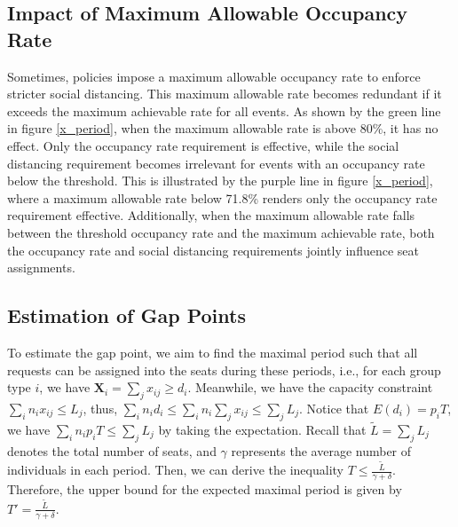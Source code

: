 \subsection*{Impact of Maximum Allowable Occupancy Rate}
Sometimes, policies impose a maximum allowable occupancy rate to enforce stricter social distancing. This maximum allowable rate becomes redundant if it exceeds the maximum achievable rate for all events. As shown by the green line in figure \ref{x_period}, when the maximum allowable rate is above 80\%, it has no effect. Only the occupancy rate requirement is effective, while the social distancing requirement becomes irrelevant for events with an occupancy rate below the threshold. This is illustrated by the purple line in figure \ref{x_period}, where a maximum allowable rate below 71.8\% renders only the occupancy rate requirement effective. Additionally, when the maximum allowable rate falls between the threshold occupancy rate and the maximum achievable rate, both the occupancy rate and social distancing requirements jointly influence seat assignments.




\subsection{Estimation of Gap Points}
To estimate the gap point, we aim to find the maximal period such that all requests can be assigned into the seats during these periods, i.e., for each group type $i$, we have $\bm{X}_{i} = \sum_{j} x_{ij} \geq d_i$. Meanwhile, we have the capacity constraint $\sum_{i} n_{i} x_{ij} \leq L_j$, thus, $\sum_{i} n_i d_i \leq \sum_{i} n_i \sum_{j} x_{ij} \leq \sum_{j} L_{j}$. Notice that $E(d_i) = p_i T$, we have $\sum_{i} n_i p_i T \leq \sum_{j} L_{j}$ by taking the expectation. Recall that $\tilde{L} = \sum_{j} L_{j}$ denotes the total number of seats, and $\gamma$ represents the average number of individuals in each period. Then, we can derive the inequality $T \leq \frac{\tilde{L}}{\gamma + \delta}$. Therefore, the upper bound for the expected maximal period is given by $T' = \frac{\tilde{L}}{\gamma + \delta}$.


